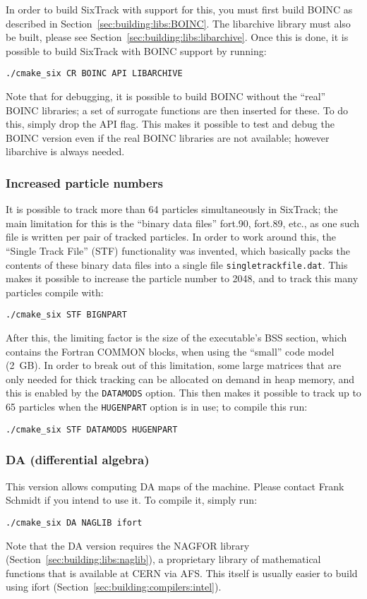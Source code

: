 \documentclass[english,BCOR=0mm,DIV=18]{scrartcl}
\begin{document}
In order to build SixTrack with support for this, you must first build BOINC as described in Section~\ref{sec:building:libs:BOINC}.
The libarchive library must also be built, please see Section~\ref{sec:building:libs:libarchive}.
Once this is done, it is possible to build SixTrack with BOINC support by running:
\begin{lstlisting}
./cmake_six CR BOINC API LIBARCHIVE
\end{lstlisting}

Note that for debugging, it is possible to build BOINC without the ``real'' BOINC libraries; a set of surrogate functions are then inserted for these.
To do this, simply drop the API flag.
This makes it possible to test and debug the BOINC version even if the real BOINC libraries are not available; however libarchive is always needed.


\subsubsection{Increased particle numbers}
It is possible to track more than 64 particles simultaneously in SixTrack; the main limitation for this is the ``binary data files'' fort.90, fort.89, etc., as one such file is written per pair of tracked particles.
In order to work around this, the ``Single Track File'' (STF) functionality was invented, which basically packs the contents of these binary data files into a single file \texttt{singletrackfile.dat}.
This makes it possible to increase the particle number to 2048, and to track this many particles compile with:
\begin{lstlisting}
./cmake_six STF BIGNPART
\end{lstlisting}

After this, the limiting factor is the size of the executable's BSS section, which contains the Fortran COMMON blocks, when using the ``small'' code model (2~GB).
In order to break out of this limitation, some large matrices that are only needed for thick tracking can be allocated on demand in heap memory, and this is enabled by the \texttt{DATAMODS} option.
This then makes it possible to track up to 65 particles when the \texttt{HUGENPART} option is in use; to compile this run:
\begin{lstlisting}
./cmake_six STF DATAMODS HUGENPART
\end{lstlisting}


\subsubsection{DA (differential algebra)}
This version allows computing DA maps of the machine.
Please contact Frank Schmidt if you intend to use it.
To compile it, simply run:
\begin{lstlisting}
./cmake_six DA NAGLIB ifort
\end{lstlisting}
Note that the DA version requires the NAGFOR library (Section~\ref{sec:building:libs:naglib}), a proprietary library of mathematical functions that is available at CERN via AFS.
This itself is usually easier to build using ifort (Section~\ref{sec:building:compilers:intel}).
\end{document}
